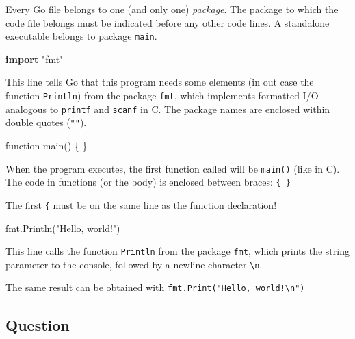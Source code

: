 \documentclass[]{book}
\newenvironment{Shaded}{\begin{snugshade}}{\end{snugshade}}
\newcommand{\KeywordTok}[1]{\textcolor[rgb]{0.13,0.29,0.53}{\textbf{#1}}}
\newcommand{\NormalTok}[1]{#1}
\newcommand{\StringTok}[1]{\textcolor[rgb]{0.31,0.60,0.02}{#1}}
\let\BeginKnitrBlock\begin \let\EndKnitrBlock\end
\begin{document}
Every Go file belongs to one (and only one) \emph{package}. The package to which the
code file belongs must be indicated before any other code lines. A standalone
executable belongs to package \texttt{main}.

\begin{Shaded}
\begin{Highlighting}[]
\KeywordTok{import} \StringTok{"fmt"}
\end{Highlighting}
\end{Shaded}

This line tells Go that this program needs some elements (in out case the
function \texttt{Println}) from the package \texttt{fmt}, which implements formatted I/O
analogous to \texttt{printf} and \texttt{scanf} in C. The package names are enclosed within
double quotes (\texttt{""}).

\begin{Shaded}
\begin{Highlighting}[]
\NormalTok{function main() \{ \}}
\end{Highlighting}
\end{Shaded}

When the program executes, the first function called will be \texttt{main()} (like in
C). The code in functions (or the body) is enclosed between braces: \texttt{\{\ \}}

\BeginKnitrBlock{rmdnote}
The first \texttt{\{} must be on the same line as the function declaration!
\EndKnitrBlock{rmdnote}

\begin{Shaded}
\begin{Highlighting}[]
\NormalTok{    fmt.Println(}\StringTok{"Hello, world!"}\NormalTok{)}
\end{Highlighting}
\end{Shaded}

This line calls the function \texttt{Println} from the package \texttt{fmt}, which prints the
string parameter to the console, followed by a newline character \texttt{\textbackslash{}n}.

\BeginKnitrBlock{rmdnote}
The same result can be obtained with \texttt{fmt.Print("Hello,\ world!\textbackslash{}n")}
\EndKnitrBlock{rmdnote}

\hypertarget{question-2}{%
\subsection*{Question}\label{question-2}}
\end{document}
